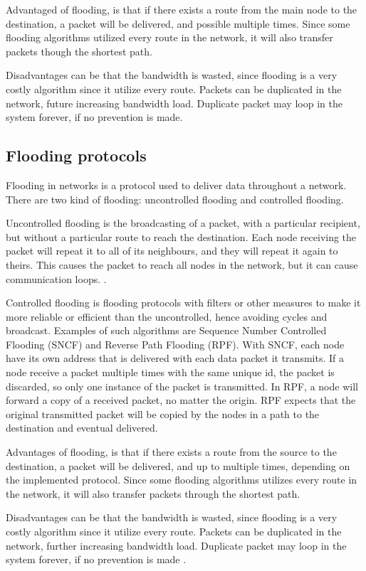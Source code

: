 Advantaged of flooding, is that if there exists a route from the main node to the destination, a packet will be delivered, and possible multiple times.
Since some flooding algorithms utilized every route in the network, it will also transfer packets though the shortest path\cite{flooding}.

Disadvantages can be that the bandwidth is wasted, since flooding is a very costly algorithm since it utilize every route.
Packets can be duplicated in the network, future increasing bandwidth load.
Duplicate packet may loop in the system forever, if no prevention is made\cite{flooding}.

\subsection{Flooding protocols}
Flooding in networks is a protocol used to deliver data throughout a network.
There are two kind of flooding: uncontrolled flooding and controlled flooding\cite{controlled_flooding}.

Uncontrolled flooding is the broadcasting of a packet, with a particular recipient, but without a particular route to reach the destination. Each node receiving the packet will repeat it to all of its neighbours, and they will repeat it again to theirs. This causes the packet to reach all nodes in the network, but it can cause communication loops. \cite{flooding}.

Controlled flooding is flooding protocols with filters or other measures to make it more reliable or efficient than the uncontrolled, hence avoiding cycles and broadcast\cite{controlled_flooding}.
Examples of such algorithms are Sequence Number Controlled Flooding (SNCF) and Reverse Path Flooding (RPF).
With SNCF, each node have its own address that is delivered with each data packet it transmits.
If a node receive a packet multiple times with the same unique id, the packet is discarded, so only one instance of the packet is transmitted.
In RPF, a node will forward a copy of a received packet, no matter the origin.
RPF expects that the original transmitted packet will be copied by the nodes in a path to the destination and eventual delivered\cite{RPF}.

Advantages of flooding, is that if there exists a route from the source to the destination, a packet will be delivered, and up to multiple times, depending on the implemented protocol.
Since some flooding algorithms utilizes every route in the network, it will also transfer packets through the shortest path\cite{flooding}.

Disadvantages can be that the bandwidth is wasted, since flooding is a very costly algorithm since it utilize every route.
Packets can be duplicated in the network, further increasing bandwidth load.
Duplicate packet may loop in the system forever, if no prevention is made \cite{flooding}.
